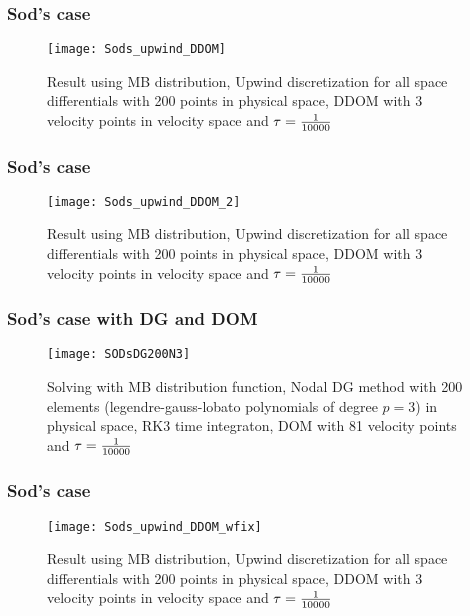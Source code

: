 \begin{frame}
	\frametitle{Sod's case}
		
		\begin{figure}
			\centering
				\texttt{[image: Sods\_upwind\_DDOM]}
			\caption{Result using MB distribution, Upwind discretization for all space differentials with 200 points in physical space, DDOM with 3 velocity points in velocity space and $\tau = {1 \over 10000}$}
			\label{fig:MB_Sod_DDOM}
		\end{figure}
		
\end{frame}

\begin{frame}
	\frametitle{Sod's case}
		
		\begin{figure}
			\centering
				\texttt{[image: Sods\_upwind\_DDOM\_2]}
			\caption{Result using MB distribution, Upwind discretization for all space differentials with 200 points in physical space, DDOM with 3 velocity points in velocity space and $\tau = {1 \over 10000}$}
			\label{fig:MB_Sod_DDOM2}
		\end{figure}
		
\end{frame}

\begin{frame}
	\frametitle{Sod's case with DG and DOM}
			
		\begin{figure}
			\centering
				\texttt{[image: SODsDG200N3]}
			\caption{Solving with MB distribution function, Nodal DG method with 200 elements (legendre-gauss-lobato polynomials of degree $p=3$) in physical space, RK3 time integraton, DOM with 81 velocity points and $\tau = {1 \over 10000}$}
			\label{fig:SODsDG200N3}
		\end{figure}
	
\end{frame}

\begin{frame}
	\frametitle{Sod's case}
		
		\begin{figure}
			\centering
				\texttt{[image: Sods\_upwind\_DDOM\_wfix]}
			\caption{Result using MB distribution, Upwind discretization for all space differentials with 200 points in physical space, DDOM with 3 velocity points in velocity space and $\tau = {1 \over 10000}$}
			\label{fig:MB_Sods_DDOM_wfix}
		\end{figure}
		
\end{frame}

